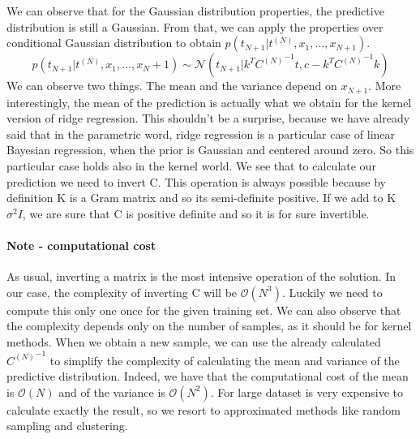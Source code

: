 \documentclass[../main.tex]{subfiles}
\begin{document}
We can observe that for the Gaussian distribution properties, the predictive distribution is still a Gaussian. From that, we can apply the properties over conditional Gaussian distribution to obtain $p(t_{N+1}|t^{(N)},x_1,\dots,x_{N+1})$.
\begin{equation}
    p(t_{N+1}|t^{(N)},x_1,\dots,x_N+1) \sim \mathcal{N}(t_{N+1}|k^T {C^{(N)}}^{-1} t, c - k^T {C^{(N)}}^{-1} k)
\end{equation}
We can observe two things. The mean and the variance depend on $x_{N+1}$. More interestingly, the mean of the prediction is actually what we obtain for the kernel version of ridge regression. This shouldn't be a surprise, because we have already said that in the parametric word, ridge regression is a particular case of linear Bayesian regression, when the prior is Gaussian and centered around zero. So this particular case holds also in the kernel world.
We see that to calculate our prediction we need to invert C. This operation is always possible because by definition K is a Gram matrix and so its semi-definite positive. If we add to K $\sigma^2 I$, we are sure that C is positive definite and so it is for sure invertible.
\paragraph{Note - computational cost} As usual, inverting a matrix is the most intensive operation of the solution. In our case, the complexity of inverting C will be $\mathcal{O}(N^3)$. Luckily we need to compute this only one once for the given training set. We can also observe that the complexity depends only on the number of samples, as it should be for kernel methods. When we obtain a new sample, we can use the already calculated ${C^{(N)}}^{-1}$ to simplify the complexity of calculating the mean and variance of the predictive distribution. Indeed, we have that the computational cost of the mean is $\mathcal{O}(N)$ and of the variance is $\mathcal{O}(N^2)$. For large dataset is very expensive to calculate exactly the result, so we resort to approximated methods like random sampling and clustering.
\end{document}
